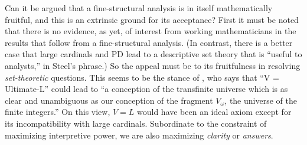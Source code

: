 \documentclass[letterpaper,12pt]{article}
\begin{document}
Can it be argued that a fine-structural analysis is in itself mathematically fruitful, and this is an extrinsic ground for its acceptance? First it must be noted that there is no evidence, as yet, of interest from working mathematicians in the results that follow from a fine-structural analysis. (In contrast, there is a better case that large cardinals and PD lead to a descriptive set theory that is ``useful to analysts,'' in Steel's \citeyearpar{feferman2000does} phrase.) So the appeal must be to its fruitfulness in resolving \emph{set-theoretic} questions. This seems to be the stance of \cite{woodin2009continuum}, who says that ``V = Ultimate-L'' could lead to ``a conception of the transfinite universe which is as clear and unambiguous as our conception of the fragment $V_\omega$, the universe of the finite integers.'' On this view, $V = L$ would have been an ideal axiom except for its incompatibility with large cardinals. Subordinate to the constraint of maximizing interpretive power, we are also maximizing \emph{clarity} or \emph{answers}.
\end{document}
